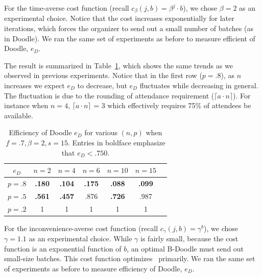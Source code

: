 For the time-averse cost function (recall $c_{\beta}(j, b) = \beta^j \cdot b$), we chose $\beta = 2$ as an experimental choice. Notice that the cost increases exponentially for later iterations, which forces the organizer to send out a small number of batches (as in Doodle). We ran the same set of experiments as before to measure efficient of Doodle, $e_{D}$.

The result is summarized in Table~\ref{bdoodle:table:DoodleEfficiency-lower-attendance_time_averse}, which shows the same trends as we observed in previous experiments. Notice that in the first row ($p = .8$), as $n$ increases we expect $e_{D}$ to decrease, but $e_{D}$ fluctuates while decreasing in general. The fluctuation is due to the rounding of attendance requirement ($\lceil a \cdot n \rceil$). For instance when $n = 4$, $\lceil a \cdot n \rceil$ = 3 which effectively requires 75\% of attendees be available.
\begin{table}[h]  %
\centering
\begin{tabular}{|c|c|c|c|c|c|c|}
	\hline
	$e_{D}$ & $n = 2$ & $n = 4$ & $n = 6$ & $ n = 10 $ & $n = 15$ \\ \hline
	$p = .8$ & \textbf{.180} & \textbf{.104} & \textbf{.175} & \textbf{.088} & \textbf{.099} \\ \hline
	$p = .5$ & \textbf{.561} & \textbf{.457} & .876 & \textbf{.726} & .987  \\ \hline
	$p = .2$ & 1 & 1 & 1 & 1 & 1\\ \hline
\end{tabular}
\caption{Efficiency of Doodle $e_{D}$ for various $(n, p)$ when $f = .7, \beta=2, s = 15$.
Entries in boldface emphasize that $e_{D} < .750$.
} \label{bdoodle:table:DoodleEfficiency-lower-attendance_time_averse}
\end{table}

For the inconvenience-averse cost function (recall $c_{\gamma}(j, b) = \gamma^{b}$), we chose $\gamma = 1.1$ as an experimental choice. While $\gamma$ is fairly small, because the cost function is an exponential function of $b$, an optimal B-Doodle must send out small-size batches. This cost function optimizes \Inconvenience\ primarily. We ran the same set of experiments as before to measure efficiency of Doodle, $e_{D}$.

